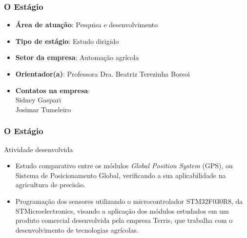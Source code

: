 \begin{frame}
\frametitle{O Estágio}

\begin{itemize}
	\item \textbf{Área de atuação}: Pesquisa e desenvolvimento
	\pause
	\item \textbf{Tipo de estágio}: Estudo dirigido
	\pause
	\item \textbf{Setor da empresa}: Automação agrícola
	\pause	
	\item \textbf{Orientador(a)}: Professora Dra. Beatriz Terezinha Borsoi
	\pause
	\item \textbf{Contatos na empresa}: \\Sidney Gaspari\\ Josimar Tumeleiro
\end{itemize}
\end{frame}

\begin{frame}
\frametitle{O Estágio}

\begin{block}{Atividade desenvolvida}
\begin{itemize}
\item Estudo comparativo entre os módulos \textit{Global Position System} (GPS), ou Sistema de Posicionamento Global, verificando a sua aplicabilidade na agricultura de precisão.
\pause 
\item Programação dos sensores utilizando o microcontrolador STM32F030R8, da STMicroelectronics\textregistered, visando a aplicação dos módulos estudados em um produto comercial desenvolvida pela empresa Terris\textregistered, que trabalha com o desenvolvimento de tecnologias agrícolas.
\end{itemize}
\end{block}

\end{frame}


